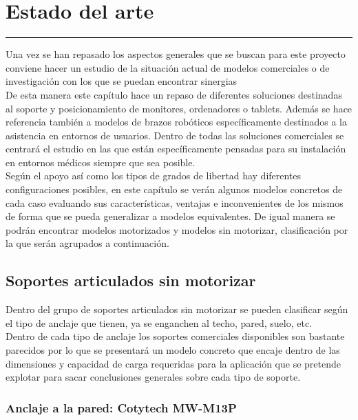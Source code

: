 \textbf{}\chapter{Estado del arte} \label{chap:estadoarte}
\hrule
\vspace{3mm}

Una vez se han repasado los aspectos generales que se buscan para este proyecto conviene hacer un estudio de la situación actual de modelos comerciales o de investigación con los que se puedan encontrar sinergias 
\\

De esta manera este capítulo hace un repaso de diferentes soluciones destinadas al soporte y posicionamiento de monitores, ordenadores o tablets. Además se hace referencia también a modelos de brazos robóticos específicamente destinados a la asistencia en entornos de usuarios. Dentro de todas las soluciones comerciales se centrará el estudio en las que están específicamente pensadas para su instalación en entornos médicos siempre que sea posible.
\\

Según el apoyo así como los tipos de grados de libertad hay diferentes configuraciones posibles, en este capítulo se verán algunos modelos concretos de cada caso evaluando sus características, ventajas e inconvenientes de los mismos de forma que se pueda generalizar a modelos equivalentes. De igual manera se podrán encontrar modelos motorizados y modelos sin motorizar, clasificación por la que serán agrupados a continuación.
\\

\section{Soportes articulados sin motorizar}

Dentro del grupo de soportes articulados sin motorizar se pueden clasificar según el tipo de anclaje que tienen, ya se enganchen al techo, pared, suelo, etc.
\\

Dentro de cada tipo de anclaje los soportes comerciales disponibles son bastante parecidos por lo que se presentará un modelo concreto que encaje dentro de las dimensiones y capacidad de carga requeridas para la aplicación que se pretende explotar para sacar conclusiones generales sobre cada tipo de soporte.

\subsection{Anclaje a la pared: Cotytech MW-M13P}

